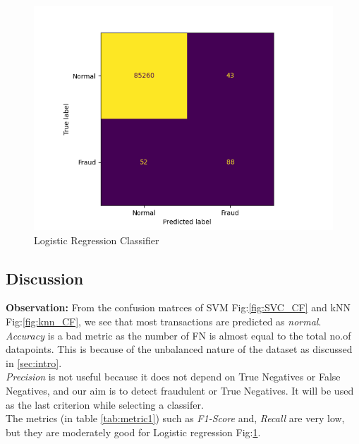 \documentclass[letterpaper, 11 pt, conference]{ieeeconf}  %
\begin{document}
\begin{figure}[h]
    \centering
    \includegraphics[width=\columnwidth]{Images/LogR_norm_CF.png}
    \caption{Logistic Regression Classifier}
    \label{fig:LogR_CF}
\end{figure}

\vspace{5em}

\subsection{Discussion}
\noindent\textbf{Observation:} From the confusion matrces of SVM Fig:\ref{fig:SVC_CF} and kNN Fig:\ref{fig:knn_CF}, we see that most transactions are predicted as \textit{normal}. \\
\textit{Accuracy} is a bad metric as the number of FN is almost equal to the total no.of datapoints. This is because of the unbalanced nature of the dataset as discussed in \ref{sec:intro}.\\
\textit{Precision} is not useful because it does not depend on True Negatives or False Negatives, and our aim is to detect fraudulent or True Negatives. It will be used as the last criterion while selecting a classifer.\\
The metrics (in table \ref{tab:metric1}) such as \textit{F1-Score} and, \textit{Recall} are very low, but they are moderately good for Logistic regression Fig:\ref{fig:LogR_CF}. \\\vspace{5em}
\end{document}
